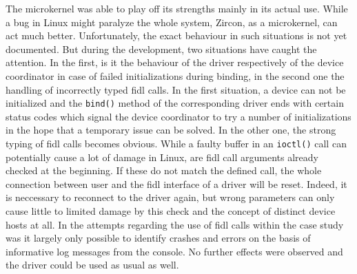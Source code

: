The microkernel was able to play off its strengths mainly in its actual use.
While a bug in Linux might paralyze the whole system, Zircon, as a microkernel, can act much better.
Unfortunately, the exact behaviour in such situations is not yet documented.
But during the development, two situations have caught the attention.
In the first, is it the behaviour of the driver respectively of the device coordinator in case of failed initializations during binding, in the second one the handling of incorrectly typed \ac{fidl} calls.
In the first situation, a device can not be initialized and the \texttt{bind()} method of the corresponding driver ends with certain status codes which signal the device coordinator to try a number of initializations in the hope that a temporary issue can be solved.
In the other one, the strong typing of \ac{fidl} calls becomes obvious.
While a faulty buffer in an \texttt{ioctl()} call can potentially cause a lot of damage in Linux, are \ac{fidl} call arguments already checked at the beginning.
If these do not match the defined call, the whole connection between user and the \ac{fidl} interface of a driver will be reset.
Indeed, it is neccessary to reconnect to the driver again, but wrong parameters can only cause little to limited damage by this check and the concept of distinct device hosts at all.
In the attempts regarding the use of \ac{fidl} calls within the case study was it largely only possible to identify crashes and errors on the basis of informative log messages from the console.
No further effects were observed and the driver could be used as usual as well.

